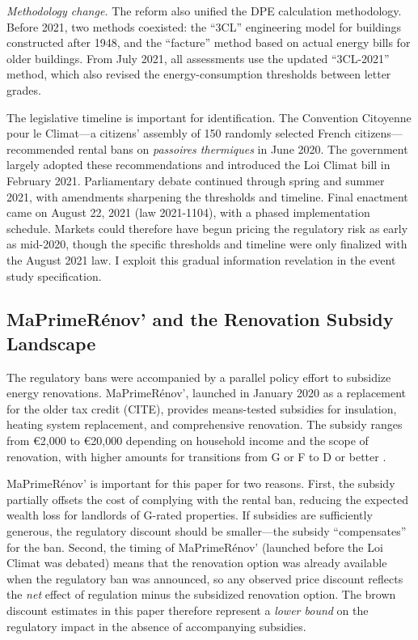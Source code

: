 \documentclass[12pt]{article}
\begin{document}
\textit{Methodology change.} The reform also unified the DPE calculation methodology. Before 2021, two methods coexisted: the ``3CL'' engineering model for buildings constructed after 1948, and the ``facture'' method based on actual energy bills for older buildings. From July 2021, all assessments use the updated ``3CL-2021'' method, which also revised the energy-consumption thresholds between letter grades.

The legislative timeline is important for identification. The Convention Citoyenne pour le Climat---a citizens' assembly of 150 randomly selected French citizens---recommended rental bans on \textit{passoires thermiques} in June 2020. The government largely adopted these recommendations and introduced the Loi Climat bill in February 2021. Parliamentary debate continued through spring and summer 2021, with amendments sharpening the thresholds and timeline. Final enactment came on August 22, 2021 (law 2021-1104), with a phased implementation schedule. Markets could therefore have begun pricing the regulatory risk as early as mid-2020, though the specific thresholds and timeline were only finalized with the August 2021 law. I exploit this gradual information revelation in the event study specification.

\subsection{MaPrimeR\'enov' and the Renovation Subsidy Landscape}

The regulatory bans were accompanied by a parallel policy effort to subsidize energy renovations. MaPrimeR\'enov', launched in January 2020 as a replacement for the older tax credit (CITE), provides means-tested subsidies for insulation, heating system replacement, and comprehensive renovation. The subsidy ranges from \euro{}2,000 to \euro{}20,000 depending on household income and the scope of renovation, with higher amounts for transitions from G or F to D or better \citep{desLandes2024renovation}.

MaPrimeR\'enov' is important for this paper for two reasons. First, the subsidy partially offsets the cost of complying with the rental ban, reducing the expected wealth loss for landlords of G-rated properties. If subsidies are sufficiently generous, the regulatory discount should be smaller---the subsidy ``compensates'' for the ban. Second, the timing of MaPrimeR\'enov' (launched before the Loi Climat was debated) means that the renovation option was already available when the regulatory ban was announced, so any observed price discount reflects the \textit{net} effect of regulation minus the subsidized renovation option. The brown discount estimates in this paper therefore represent a \textit{lower bound} on the regulatory impact in the absence of accompanying subsidies.
\end{document}
